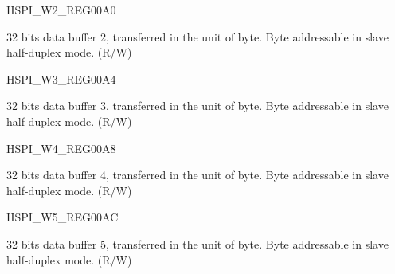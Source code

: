 \begin{register}{H}{SPI\_W2\_REG}{\hexprefix{}00A0}\label{regdesc:SPIW2REG}
%
\regnewline%
\begin{regdesc}\begin{reglist}
\label{fielddesc:SPIBUF2}\item [SPI\_BUF2] 32 bits data buffer 2, transferred in the unit of byte. Byte addressable in slave half-duplex mode. (R/W)
\end{reglist}\end{regdesc}
\end{register}


\begin{register}{H}{SPI\_W3\_REG}{\hexprefix{}00A4}\label{regdesc:SPIW3REG}
%
\regnewline%
\begin{regdesc}\begin{reglist}
\label{fielddesc:SPIBUF3}\item [SPI\_BUF3] 32 bits data buffer 3, transferred in the unit of byte. Byte addressable in slave half-duplex mode. (R/W)
\end{reglist}\end{regdesc}
\end{register}


\begin{register}{H}{SPI\_W4\_REG}{\hexprefix{}00A8}\label{regdesc:SPIW4REG}
%
\regnewline%
\begin{regdesc}\begin{reglist}
\label{fielddesc:SPIBUF4}\item [SPI\_BUF4] 32 bits data buffer 4, transferred in the unit of byte. Byte addressable in slave half-duplex mode. (R/W)
\end{reglist}\end{regdesc}
\end{register}


\begin{register}{H}{SPI\_W5\_REG}{\hexprefix{}00AC}\label{regdesc:SPIW5REG}
%
\regnewline%
\begin{regdesc}\begin{reglist}
\label{fielddesc:SPIBUF5}\item [SPI\_BUF5] 32 bits data buffer 5, transferred in the unit of byte. Byte addressable in slave half-duplex mode. (R/W)
\end{reglist}\end{regdesc}
\end{register}


